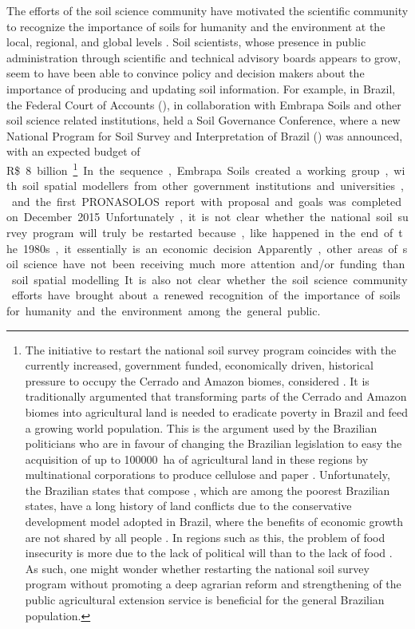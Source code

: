 \def\footpronassolos{\footnote{The initiative to restart the national soil survey program coincides with the 
currently increased, government funded, economically driven, historical pressure to occupy the Cerrado and 
Amazon biomes, considered \q{the last agricultural frontier} \cite{Correia2005, Macarini2005, Silva2005, 
CarvalhoEtAl2009, Batlle-BayerEtAl2010, MartinelliEtAl2010, SchneiderEtAl2015}. It is traditionally argumented 
that transforming parts of the Cerrado and Amazon biomes into agricultural land is needed to eradicate poverty 
in Brazil and feed a growing world population. This is the argument used by the Brazilian politicians who are 
in favour of changing the Brazilian legislation to easy the acquisition of up to \SI{100000}{\hectare} of 
agricultural land in these regions by multinational corporations to produce cellulose and paper 
\cite{SECOM2015}. Unfortunately, the Brazilian states that compose \q{the last agricultural frontier}, which 
are among the poorest Brazilian states, have a long history of land conflicts due to the conservative 
development model adopted in Brazil, where the benefits of economic growth are not shared by all people 
\cite{ComissaoPastoraldaTerra2015}. In regions such as this, the problem of food insecurity is more due to the 
lack of political will than to the lack of food \cite{FAO2005, FAO2009, FAO2015}. As such, one might wonder 
whether restarting the national soil survey program without promoting a deep agrarian reform and strengthening 
of the public agricultural extension service is beneficial for the general Brazilian population.}}

The efforts of the soil science community have motivated the scientific community to recognize the importance 
of soils for humanity and the environment at the local, regional, and global levels \cite{SanchezEtAl2009, 
Kempen2011, OmutoEtAl2013}. Soil scientists, whose presence in public administration through scientific and 
technical advisory boards appears to grow, seem to have been able to convince policy and decision makers about 
the importance of producing and updating soil information. For example, in Brazil, the Federal Court of 
Accounts (\tcu), in collaboration with Embrapa Soils and other soil science related institutions, held a Soil 
Governance Conference, where a new National Program for Soil Survey and Interpretation of Brazil (\pronassolos) 
was announced, with an expected budget of \SI{8}[R\$]~billion\footpronassolos. In the sequence, Embrapa Soils 
created a working group, with soil spatial modellers from other government institutions and universities, and 
the first PRONASOLOS report with proposal and goals was completed on December 2015. Unfortunately, it is not 
clear whether the national soil survey program will truly be restarted because, like happened in the end of the 
1980s, it essentially is an economic decision. Apparently, other areas of soil science have not been receiving 
much more attention and/or funding than soil spatial modelling. It is also not clear whether the soil science 
community efforts have brought about a renewed recognition of the importance of soils for humanity and the 
environment among the general public.

